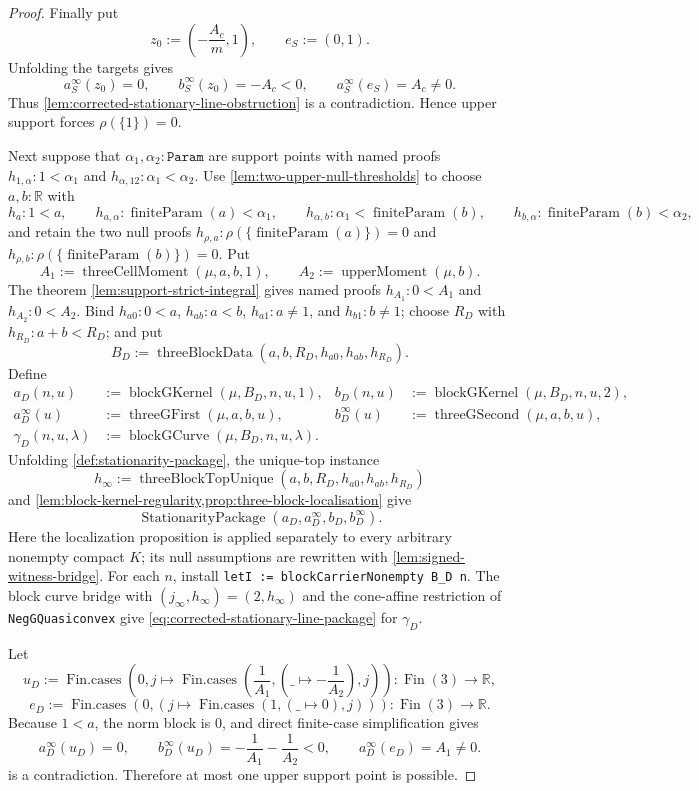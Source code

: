 \documentclass[9pt]{extarticle}
\theoremstyle{definition}
\theoremstyle{remark}
\newcommand{\R}{\mathbb R}
\begin{document}
\begin{proof}
Finally put
\[
 z_0:=\left(-\frac{A_c}{m},1\right),\qquad e_S:=(0,1).
\]
Unfolding the targets gives
\[
 a_S^\infty(z_0)=0,\qquad
 b_S^\infty(z_0)=-A_c<0,\qquad
 a_S^\infty(e_S)=A_c\neq0.
\]
Thus \cref{lem:corrected-stationary-line-obstruction} is a contradiction.
Hence upper support forces $\rho(\{1\})=0$.

Next suppose that $\alpha_1,\alpha_2:\texttt{Param}$ are support points with
named proofs $h_{1,\alpha}:1<\alpha_1$ and
$h_{\alpha,12}:\alpha_1<\alpha_2$.  Use
\cref{lem:two-upper-null-thresholds} to choose $a,b:\R$ with
\[
 h_a:1<a,\qquad
 h_{a,\alpha}:\operatorname{finiteParam}(a)<\alpha_1,\qquad
 h_{\alpha,b}:\alpha_1<\operatorname{finiteParam}(b),\qquad
 h_{b,\alpha}:\operatorname{finiteParam}(b)<\alpha_2,
\]
and retain the two null proofs
$h_{\rho,a}:\rho(\{\operatorname{finiteParam}(a)\})=0$ and
$h_{\rho,b}:\rho(\{\operatorname{finiteParam}(b)\})=0$.  Put
\[
 A_1:=\operatorname{threeCellMoment}(\mu,a,b,1),
 \qquad A_2:=\operatorname{upperMoment}(\mu,b).
\]
The theorem \cref{lem:support-strict-integral} gives named proofs
$h_{A_1}:0<A_1$ and $h_{A_2}:0<A_2$.  Bind
$h_{a0}:0<a$, $h_{ab}:a<b$, $h_{a1}:a\neq1$, and $h_{b1}:b\neq1$; choose
$R_D$ with $h_{R_D}:a+b<R_D$; and put
\[
 B_D:=\operatorname{threeBlockData}
  (a,b,R_D,h_{a0},h_{ab},h_{R_D}).
\]
Define
\begin{align*}
 a_D(n,u)&:=\operatorname{blockGKernel}(\mu,B_D,n,u,1),&
 b_D(n,u)&:=\operatorname{blockGKernel}(\mu,B_D,n,u,2),\\
 a_D^\infty(u)&:=\operatorname{threeGFirst}(\mu,a,b,u),&
 b_D^\infty(u)&:=\operatorname{threeGSecond}(\mu,a,b,u),\\
 \gamma_D(n,u,\lambda)&:=
   \operatorname{blockGCurve}(\mu,B_D,n,u,\lambda).
\end{align*}
Unfolding \cref{def:stationarity-package}, the unique-top instance
\[
 h_\infty:=\operatorname{threeBlockTopUnique}
  (a,b,R_D,h_{a0},h_{ab},h_{R_D})
\]
and \cref{lem:block-kernel-regularity,prop:three-block-localisation} give
\[
 \operatorname{StationarityPackage}
  (a_D,a_D^\infty,b_D,b_D^\infty).
\]
Here the localization proposition is applied separately to every arbitrary
nonempty compact $K$; its null assumptions are rewritten with
\cref{lem:signed-witness-bridge}.  For each $n$, install
\texttt{letI := blockCarrierNonempty B\_D n}.  The block curve bridge with
$(j_\infty,h_\infty)=(2,h_\infty)$ and the cone-affine restriction of
\texttt{NegGQuasiconvex} give
\cref{eq:corrected-stationary-line-package} for $\gamma_D$.

Let
\[
 u_D:=\operatorname{Fin.cases}\!\left(
  0,j\mapsto\operatorname{Fin.cases}
   \left(\frac1{A_1},(\_\mapsto-\frac1{A_2}),j\right)\right):
   \operatorname{Fin}(3)\to\R,
\]
\[
 e_D:=\operatorname{Fin.cases}
  (0,(j\mapsto\operatorname{Fin.cases}(1,(\_\mapsto0),j))):
  \operatorname{Fin}(3)\to\R.
\]
Because $1<a$, the norm block is $0$, and direct finite-case simplification
gives
\[
 a_D^\infty(u_D)=0,\qquad
 b_D^\infty(u_D)=-\frac1{A_1}-\frac1{A_2}<0,\qquad
 a_D^\infty(e_D)=A_1\neq0.
\]
 is a contradiction.
Therefore at most one upper support point is possible.


\end{proof}
\end{document}
